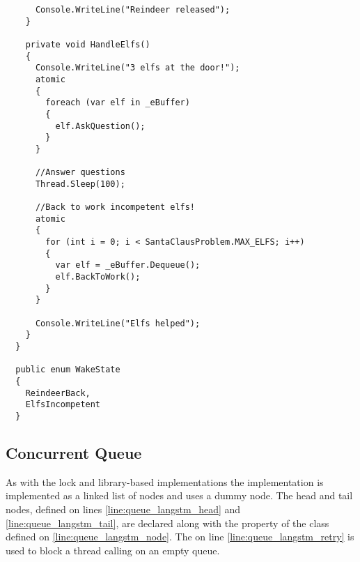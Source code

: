 \begin{lstlisting}
      Console.WriteLine("Reindeer released");
    }

    private void HandleElfs()
    {
      Console.WriteLine("3 elfs at the door!");
      atomic
      {
        foreach (var elf in _eBuffer)
        {
          elf.AskQuestion();
        }
      }

      //Answer questions
      Thread.Sleep(100);

      //Back to work incompetent elfs!
      atomic
      {
        for (int i = 0; i < SantaClausProblem.MAX_ELFS; i++)
        {
          var elf = _eBuffer.Dequeue();
          elf.BackToWork();
        }
      }

      Console.WriteLine("Elfs helped");
    }
  }

  public enum WakeState
  {
    ReindeerBack,
    ElfsIncompetent
  }

\end{lstlisting}
\subsection{Concurrent Queue}
As with the lock and library-based implementations the \stmname implementation is implemented as a linked list of nodes and uses a dummy node. The head and tail nodes, defined on lines \ref{line:queue_langstm_head} and \ref{line:queue_langstm_tail}, are declared  along with the  property of the  class defined on \ref{line:queue_langstm_node}. The  on line \ref{line:queue_langstm_retry} is used to block a thread calling  on an empty queue.

